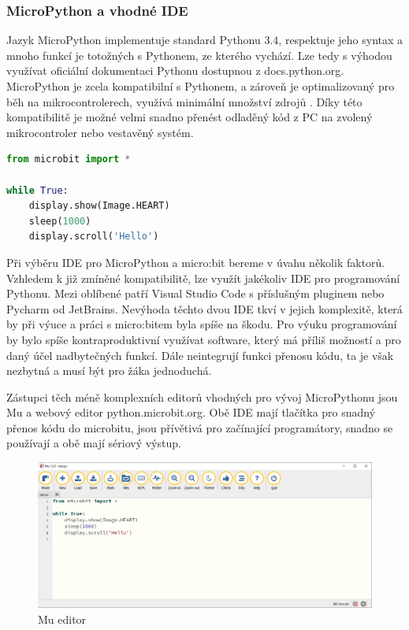 \documentclass[
  digital,     %
  oneside,     %
  nosansbold,  %
  colorbold, %
  lof,         %
  nolot,         %
]{fithesis4}
\begin{document}
\subsubsection{MicroPython a vhodné IDE}
Jazyk MicroPython implementuje standard Pythonu 3.4, respektuje jeho syntax a mnoho funkcí je totožných s Pythonem, ze kterého vychází. Lze tedy s výhodou využívat oficiální dokumentaci Pythonu dostupnou z docs.python.org. MicroPython je zcela kompatibilní s Pythonem, a zároveň je optimalizovaný pro běh na mikrocontrolerech, využívá minimální množství zdrojů \cite{microPython}. Díky této kompatibilitě je možné velmi snadno přenést odladěný kód z PC na zvolený mikrocontroler nebo vestavěný systém.

\begin{lstlisting}[language=Python, caption={MicroPython ukázka}, label={ukazkaMicroPython}]
from microbit import *

while True:
    display.show(Image.HEART)
    sleep(1000)
    display.scroll('Hello')
\end{lstlisting}

Při výběru IDE pro MicroPython a micro:bit bereme v úvahu několik faktorů. 
Vzhledem k již zmíněné kompatibilitě, lze využít jakékoliv IDE pro programování Pythonu. Mezi oblíbené patří Visual Studio Code s příslušným pluginem nebo Pycharm od JetBrains. Nevýhoda těchto dvou IDE tkví v jejich komplexitě, která by při výuce a práci s micro:bitem byla spíše na škodu. Pro výuku programování by bylo spíše kontraproduktivní využívat software, který má příliš možností a pro daný účel nadbytečných funkcí. Dále neintegrují funkci přenosu kódu, ta je však nezbytná a musí být pro žáka jednoduchá.

Zástupci těch méně komplexních editorů vhodných pro vývoj MicroPythonu jsou Mu a webový editor python.microbit.org. Obě IDE mají tlačítka pro snadný přenos kódu do microbitu, jsou přívětivá pro začínající programátory, snadno se používají a obě mají sériový výstup. 

\begin{figure}[ht]
    \centering
    \includegraphics[width=\textwidth]  {images/mu.png}
    \caption{Mu editor}
    \label{MuED}
\end{figure}
\end{document}

